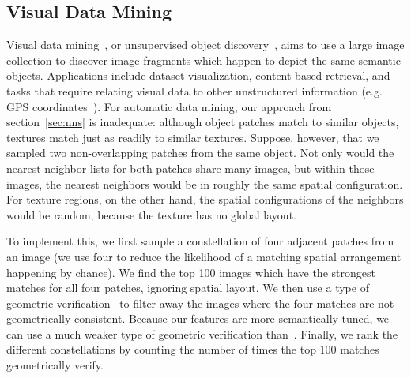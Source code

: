 \documentclass[10pt,twocolumn,letterpaper]{article}
\begin{document}
\vspace{-0.05in}
\subsection{Visual Data Mining}
\label{sec:datamining}
\vspace{-0.05in}
Visual data mining~\cite{quack2008world,doersch2012makes,singh2012unsupervised,RematasCVPR15}, or unsupervised object discovery~\cite{sivic2005discovering,russell2006using,grauman2006unsupervised}, 
aims to use a large image collection to discover image fragments which happen to depict the same semantic objects. 
Applications include dataset visualization, content-based retrieval, and tasks that require relating visual data to other unstructured information (e.g. GPS coordinates~\cite{doersch2012makes}).
For automatic data mining, our approach from section~\ref{sec:nns} is inadequate: 
although object patches match to similar objects, textures match just as readily to similar textures.  Suppose, however, that we sampled two non-overlapping patches from the same object.  Not only would the nearest neighbor lists for both patches share many images, but within those images, the nearest neighbors would be in roughly the same spatial configuration.  For texture regions, on the other hand, the spatial configurations of the neighbors would be random, because the texture has no global layout.

To implement this, we first sample a constellation of four adjacent patches from an image (we use four to reduce the likelihood of a matching spatial arrangement happening by chance). 
We find the top 100 images which have the strongest matches for all four patches, ignoring spatial layout. 
We then use a type of geometric verification~\cite{chum2007total} to filter away the images where the four matches are not geometrically consistent.
Because our features are more semantically-tuned, we can use a much weaker type of geometric verification than~\cite{chum2007total}.  
Finally, we rank the different constellations by counting the number of times the top 100 matches geometrically verify.
\end{document}
